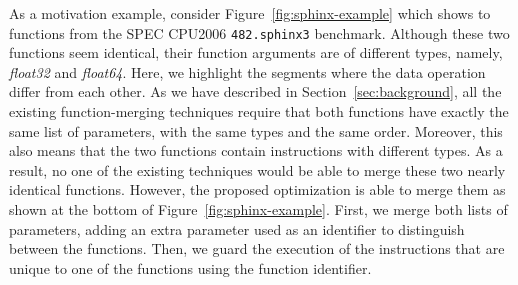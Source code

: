 As a motivation example, consider Figure~\ref{fig:sphinx-example} which shows to functions from the SPEC CPU2006 \texttt{482.sphinx3}
benchmark. Although these two functions seem identical, their function arguments are of different types, namely, \textit{float32} and
\textit{float64}. Here, we highlight the segments where the data operation differ from each other. As we have described in
Section~\ref{sec:background}, all the existing function-merging techniques require that both functions have exactly the same list of
parameters, with the same types and the same order. Moreover, this also means that the two functions contain instructions with different
types. As a result, no one of the existing techniques would be able to merge these two nearly identical functions. However, the proposed
optimization is able to merge them as shown at the bottom of Figure~\ref{fig:sphinx-example}. First, we merge both lists of parameters,
adding an extra parameter used as an identifier to distinguish between the functions. Then, we guard the execution of the instructions that
are unique to one of the functions using the function identifier. 

